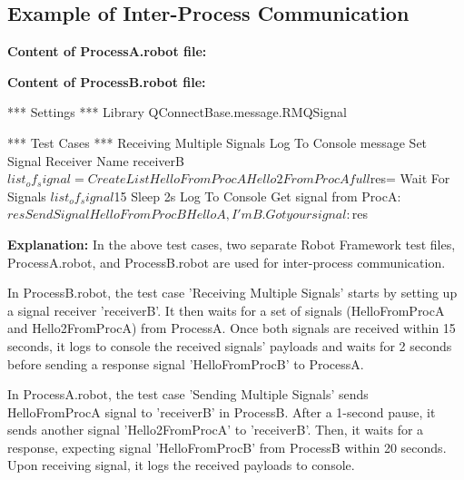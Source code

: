 \subsection{Example of Inter-Process Communication}

\textbf{Content of ProcessA.robot file:}

\textbf{Content of ProcessB.robot file:}
\begin{robotcode}
*** Settings ***
Library        QConnectBase.message.RMQSignal

*** Test Cases ***
Receiving Multiple Signals
   Log To Console    message
   Set Signal Receiver Name    receiverB
   ${list_of_signal} =    Create List    HelloFromProcA    Hello2FromProcAfull
   ${res}=    Wait For Signals    ${list_of_signal}    ${15}
   Sleep    2s
   Log To Console    Get signal from ProcA: ${res}
   Send Signal    HelloFromProcB      Hello A, I'm B. Got your signal:${res}
\end{robotcode}

\textbf{Explanation:}
In the above test cases, two separate Robot Framework test files, ProcessA.robot, and ProcessB.robot are used for inter-process communication.

In ProcessB.robot, the test case 'Receiving Multiple Signals' starts by setting up a signal receiver 'receiverB'. It then waits for a set of signals (HelloFromProcA and Hello2FromProcA) from ProcessA. Once both signals are received within 15 seconds, it logs to console the received signals' payloads and waits for 2 seconds before sending a response signal 'HelloFromProcB' to ProcessA.

In ProcessA.robot, the test case 'Sending Multiple Signals' sends HelloFromProcA signal to 'receiverB' in ProcessB. After a 1-second pause, it sends another signal 'Hello2FromProcA' to 'receiverB'. Then, it waits for a response, expecting signal 'HelloFromProcB' from ProcessB within 20 seconds. Upon receiving signal, it logs the received payloads to console.



